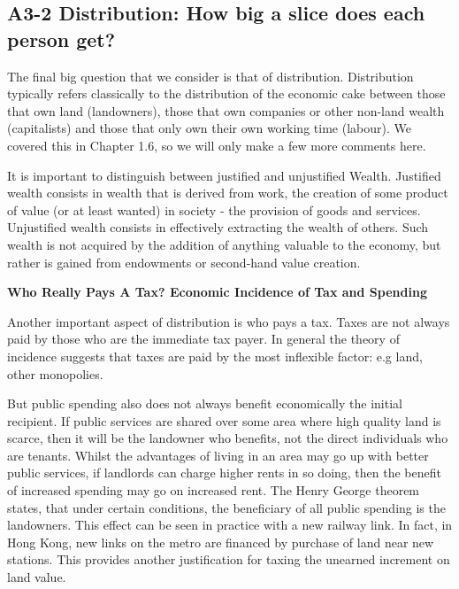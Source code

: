 \documentclass[]{tufte-handout}
\begin{document}
\hypertarget{a3-2-distribution-how-big-a-slice-does-each-person-get}{%
\subsection{A3-2 Distribution: How big a slice does each person
get?}\label{a3-2-distribution-how-big-a-slice-does-each-person-get}}

The final big question that we consider is that of distribution.
Distribution typically refers classically to the distribution of the
economic cake between those that own land (landowners), those that own
companies or other non-land wealth (capitalists) and those that only own
their own working time (labour). We covered this in Chapter 1.6, so we
will only make a few more comments here.

It is important to distinguish between justified and unjustified Wealth.
Justified wealth consists in wealth that is derived from work, the
creation of some product of value (or at least wanted) in society - the
provision of goods and services. Unjustified wealth consists in
effectively extracting the wealth of others. Such wealth is not acquired
by the addition of anything valuable to the economy, but rather is
gained from endowments or second-hand value creation.

\textbf{Who Really Pays A Tax? Economic Incidence of Tax and Spending}

Another important aspect of distribution is who pays a tax. Taxes are
not always paid by those who are the immediate tax payer. In general the
theory of incidence suggests that taxes are paid by the most inflexible
factor: e.g land, other monopolies.

But public spending also does not always benefit economically the
initial recipient. If public services are shared over some area where
high quality land is scarce, then it will be the landowner who benefits,
not the direct individuals who are tenants. Whilst the advantages of
living in an area may go up with better public services, if landlords
can charge higher rents in so doing, then the benefit of increased
spending may go on increased rent. The Henry George theorem states, that
under certain conditions, the beneficiary of all public spending is the
landowners. This effect can be seen in practice with a new railway link.
In fact, in Hong Kong, new links on the metro are financed by purchase
of land near new stations. This provides another justification for
taxing the unearned increment on land value.
\end{document}
